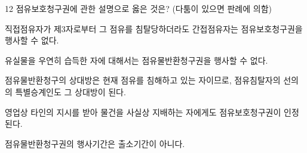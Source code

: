 \begin{question}{12}
점유보호청구권에 관한 설명으로 옳은 것은? (다툼이 있으면 판례에 의함)
\begin{choices}
  \item 직접점유자가 제3자로부터 그 점유를 침탈당하더라도 간접점유자는 점유보호청구권을 행사할 수 없다.
  \item 유실물을 우연히 습득한 자에 대해서는 점유물반환청구권을 행사할 수 없다.
  \item 점유물반환청구의 상대방은 현재 점유를 침해하고 있는 자이므로, 점유침탈자의 선의의 특별승계인도 그 상대방이 된다.
  \item 영업상 타인의 지시를 받아 물건을 사실상 지배하는 자에게도 점유보호청구권이 인정된다.
  \item 점유물반환청구권의 행사기간은 출소기간이 아니다.
\end{choices}
\end{question}
